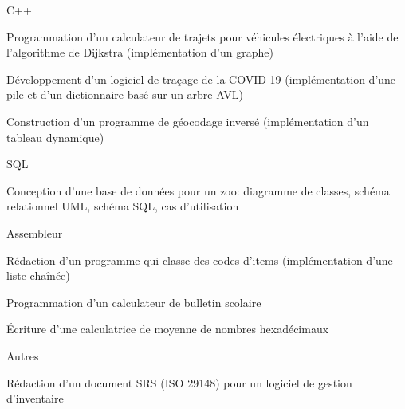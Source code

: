 \begin{cventries}
  \cventry
    {C++} %
    {} %
    {} %
    {} %
    {
      \begin{cvitems} %
        \item {Programmation d'un calculateur de trajets pour véhicules électriques à l'aide de l'algorithme de Dijkstra (implémentation d'un graphe)}
        \item {Développement d'un logiciel de traçage de la COVID 19 (implémentation d'une pile et d'un dictionnaire basé sur un arbre AVL)}
        \item {Construction d'un programme de géocodage inversé (implémentation d'un tableau dynamique)}
      \end{cvitems}
    }

  \cventry
    {SQL} %
    {} %
    {} %
    {} %
    {
      \begin{cvitems} %
        \item {Conception d'une base de données pour un zoo: diagramme de classes, schéma relationnel UML, schéma SQL, cas d'utilisation}
      \end{cvitems}
    }

  \cventry
    {Assembleur} %
    {} %
    {} %
    {} %
    {
      \begin{cvitems} %
        \item {Rédaction d'un programme qui classe des codes d'items (implémentation d'une liste chaînée)}
        \item {Programmation d'un calculateur de bulletin scolaire}
        \item {Écriture d'une calculatrice de moyenne de nombres hexadécimaux}
      \end{cvitems}
    }

  \cventry
    {Autres} %
    {} %
    {} %
    {} %
    {
      \begin{cvitems} %
        \item {Rédaction d'un document SRS (ISO 29148) pour un logiciel de gestion d'inventaire}
      \end{cvitems}
    }

\end{cventries}
